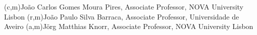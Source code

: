 (c,m){João Carlos Gomes Moura Pires, Associate Professor, NOVA University Lisbon}
(r,m){João Paulo Silva Barraca, Associate Professor, Universidade de Aveiro}
(a,m){Jörg Matthias Knorr, Associate Professor, NOVA University Lisbon}
